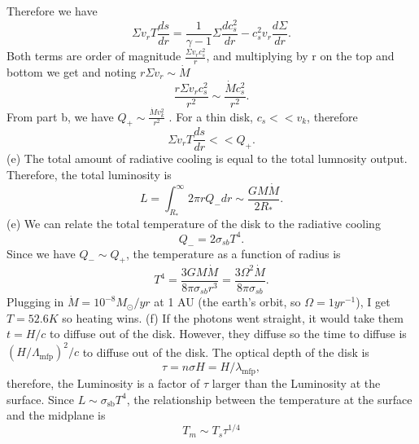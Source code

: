 \documentclass[11pt]{article}
\begin{document}
Therefore we have
\begin{equation}
 \Sigma v_r T \frac{ds}{dr} = \frac{1}{\gamma - 1} \Sigma \frac{d c_s^2}{dr} - c_s^2 v_r \frac{d \Sigma}{dr}.
\end{equation}
Both terms are order of magnitude \(\frac{\Sigma v_r c_s^2}{r}\), and multiplying by r on the top and bottom we get and noting \(r \Sigma v_r \sim \dot{M}\)
\begin{equation}
 \frac{r \Sigma v_r c_s^2}{r^2} \sim \frac{\dot{M} c_s^2}{r^2}.
\end{equation}
From part b, we have  \(Q_+ \sim \frac{\dot{M}v_k^2}{r^2}\) .
For a thin disk, \(c_s << v_k\), therefore
\begin{equation}
 \Sigma v_r T \frac{ds}{dr} << Q_+.
\end{equation}
(e) The total amount of radiative cooling is equal to the total lumnosity output.
Therefore, the total luminosity is
\begin{equation}
 L = \int_{R_*}^\infty 2 \pi r Q_- dr \sim \frac{G M \dot{M}}{2 R_*}.
\end{equation}
\newline
(e) We can relate the total temperature of the disk to the radiative cooling
\begin{equation}
 Q_- = 2 \sigma_{sb} T^4.
\end{equation}
Since we have \(Q_- \sim Q_+\), the temperature as a function of radius is
\begin{equation}
 T^4 = \frac{3 G M \dot{M}}{8 \pi \sigma_{sb} r^3} = \frac{3 \Omega^2 \dot{M}}{8 \pi \sigma_{sb}}.
\end{equation}
Plugging in \(\dot{M} = 10^{-8} M_\odot / yr\) at 1 AU (the earth's orbit, so
\(\Omega = 1yr^{-1}\)), I get \(T = 52.6 K\) so heating wins.
(f) If the photons went straight, it would take them \(t = H/c\) to diffuse out of the disk.
However, they diffuse so the time to diffuse is \(\left(H / \Lambda_{\text{mfp}} \right)^2 / c\) to diffuse out of the disk.
The optical depth of the disk is
\begin{equation}
 \tau = n \sigma H = H / \lambda_{\text{mfp}},
\end{equation}
therefore, the Luminosity is a factor of \(\tau\) larger than the Luminosity at the surface.
Since \(L \sim \sigma_{\text{sb}} T^4\), the relationship between the temperature at the surface and the midplane is
\begin{equation}
 T_m \sim T_s \tau^{1/4}
\end{equation}
\end{document}

